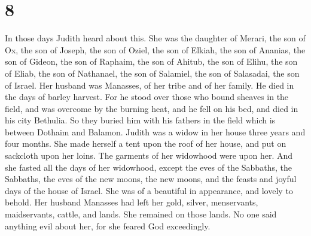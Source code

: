 \hypertarget{section-7}{%
\section{8}\label{section-7}}

 In those days Judith heard about this. She was the daughter
of Merari, the son of Ox, the son of Joseph, the son of Oziel, the son
of Elkiah, the son of Ananias, the son of Gideon, the son of Raphaim,
the son of Ahitub, the son of Elihu, the son of Eliab, the son of
Nathanael, the son of Salamiel, the son of Salasadai, the son of Israel.
 Her husband was Manasses, of her tribe and of her family.
He died in the days of barley harvest.  For he stood over
those who bound sheaves in the field, and was overcome by the burning
heat, and he fell on his bed, and died in his city Bethulia. So they
buried him with his fathers in the field which is between Dothaim and
Balamon.  Judith was a widow in her house three years and
four months.  She made herself a tent upon the roof of her
house, and put on sackcloth upon her loins. The garments of her
widowhood were upon her.  And she fasted all the days of her
widowhood, except the eves of the Sabbaths, the Sabbaths, the eves of
the new moons, the new moons, and the feasts and joyful days of the
house of Israel.  She was of a beautiful in appearance, and
lovely to behold. Her husband Manasses had left her gold, silver,
menservants, maidservants, cattle, and lands. She remained on those
lands.  No one said anything evil about her, for she feared
God exceedingly.

